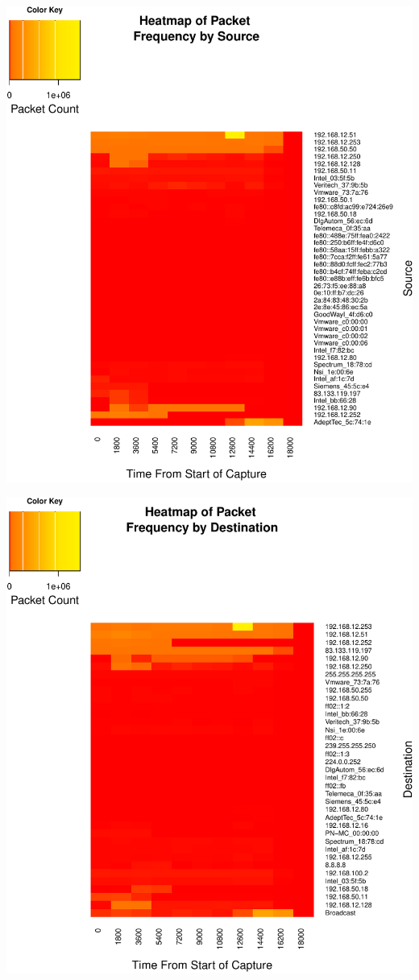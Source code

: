\documentclass[]{article}
\begin{document}
\pagebreak

\begin{center}\includegraphics{edaReport_files/figure-latex/unnamed-chunk-26-1} \end{center}

\begin{center}\includegraphics{edaReport_files/figure-latex/unnamed-chunk-27-1} \end{center}
\end{document}
